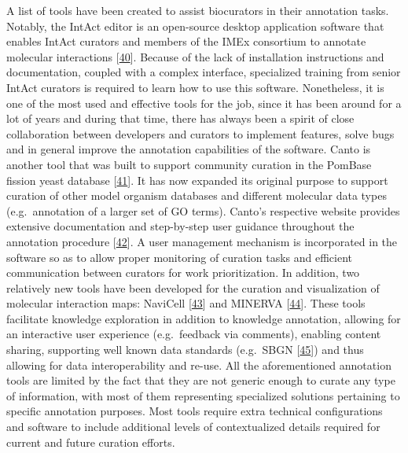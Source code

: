 \documentclass[
  12pt,
]{book}
\begin{document}
\vspace{15pt}

A list of tools have been created to assist biocurators in their annotation tasks.
Notably, the IntAct editor is an open-source desktop application software that enables IntAct curators and members of the IMEx consortium to annotate molecular interactions {[}\protect\hyperlink{ref-intact-editor}{40}{]}.
Because of the lack of installation instructions and documentation, coupled with a complex interface, specialized training from senior IntAct curators is required to learn how to use this software.
Nonetheless, it is one of the most used and effective tools for the job, since it has been around for a lot of years and during that time, there has always been a spirit of close collaboration between developers and curators to implement features, solve bugs and in general improve the annotation capabilities of the software.
Canto is another tool that was built to support community curation in the PomBase fission yeast database {[}\protect\hyperlink{ref-Rutherford2014}{41}{]}.
It has now expanded its original purpose to support curation of other model organism databases and different molecular data types (e.g.~annotation of a larger set of GO terms).
Canto's respective website provides extensive documentation and step-by-step user guidance throughout the annotation procedure {[}\protect\hyperlink{ref-canto-doc}{42}{]}.
A user management mechanism is incorporated in the software so as to allow proper monitoring of curation tasks and efficient communication between curators for work prioritization.
In addition, two relatively new tools have been developed for the curation and visualization of molecular interaction maps: NaviCell {[}\protect\hyperlink{ref-Kuperstein2013}{43}{]} and MINERVA {[}\protect\hyperlink{ref-Gawron2016}{44}{]}.
These tools facilitate knowledge exploration in addition to knowledge annotation, allowing for an interactive user experience (e.g.~feedback via comments), enabling content sharing, supporting well known data standards (e.g.~SBGN {[}\protect\hyperlink{ref-Novere2009}{45}{]}) and thus allowing for data interoperability and re-use.
All the aforementioned annotation tools are limited by the fact that they are not generic enough to curate any type of information, with most of them representing specialized solutions pertaining to specific annotation purposes.
Most tools require extra technical configurations and software to include additional levels of contextualized details required for current and future curation efforts.
\end{document}
